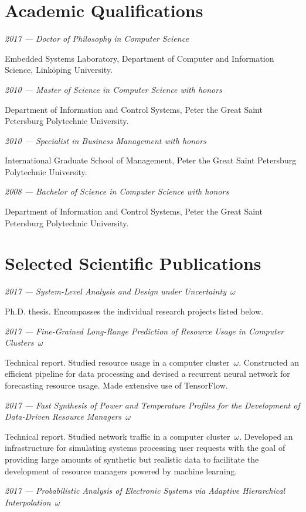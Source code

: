 \documentclass{article}
\begin{document}
\section{Academic Qualifications}
\emph{2017 --- Doctor of Philosophy in Computer Science}

Embedded Systems Laboratory, Department of Computer and Information Science,
Linköping University.

\emph{2010 --- Master of Science in Computer Science with honors}

Department of Information and Control Systems, Peter the Great Saint Petersburg
Polytechnic University.

\emph{2010 --- Specialist in Business Management with honors}

International Graduate School of Management, Peter the Great Saint Petersburg
Polytechnic University.

\emph{2008 --- Bachelor of Science in Computer Science with honors}

Department of Information and Control Systems, Peter the Great Saint Petersburg
Polytechnic University.

\section{Selected Scientific Publications}
\emph{2017 --- System-Level Analysis and Design under Uncertainty~$\omega$}

Ph.D. thesis. Encompasses the individual research projects listed below.

\emph{2017 --- Fine-Grained Long-Range Prediction of Resource Usage in Computer
Clusters~$\omega$}

Technical report. Studied resource usage in a computer cluster~$\omega$.
Constructed an efficient pipeline for data processing and devised a recurrent
neural network for forecasting resource usage. Made extensive use of TensorFlow.

\emph{2017 --- Fast Synthesis of Power and Temperature Profiles for the
Development of Data-Driven Resource Managers~$\omega$}

Technical report. Studied network traffic in a computer cluster~$\omega$.
Developed an infrastructure for simulating systems processing user requests with
the goal of providing large amounts of synthetic but realistic data to
facilitate the development of resource managers powered by machine learning.

\emph{2017 --- Probabilistic Analysis of Electronic Systems via Adaptive
Hierarchical Interpolation~$\omega$}
\end{document}

